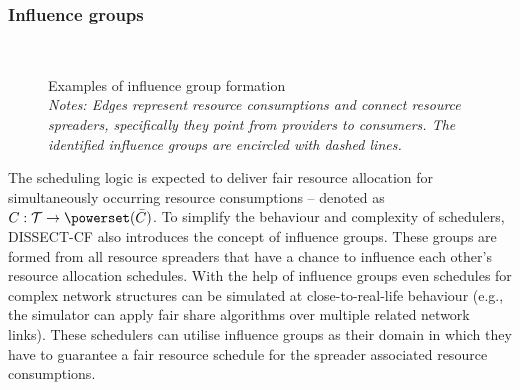 \documentclass[sort, compress, 5p]{elsarticle}
\newcommand{\SIMULATIONTIMEM}{\mathcal{T}}
\begin{document}
\subsubsection{Influence groups}
\begin{figure}[tb]
\centering
{}\\
\caption{Examples of influence group formation\\
\emph{\footnotesize Notes: Edges represent resource consumptions and connect resource spreaders, specifically they point from providers to consumers. The identified influence groups are encircled with dashed lines. }\label{FIG-INFLUENCE}}
\end{figure}

The scheduling logic is expected to deliver fair resource allocation for simultaneously occurring resource consumptions -- denoted as $C: \SIMULATIONTIMEM \to \powerset(\bar{C})$. To simplify the behaviour and complexity of schedulers, DISSECT-CF also introduces the concept of influence groups. These groups are formed from all resource spreaders that have a chance to influence each other's resource allocation schedules. With the help of influence groups even schedules for complex network structures can be simulated at close-to-real-life behaviour (e.g., the simulator can apply fair share algorithms over multiple related network links). These schedulers can utilise influence groups as their domain in which they have to guarantee a fair resource schedule for the spreader associated resource consumptions.
\end{document}
